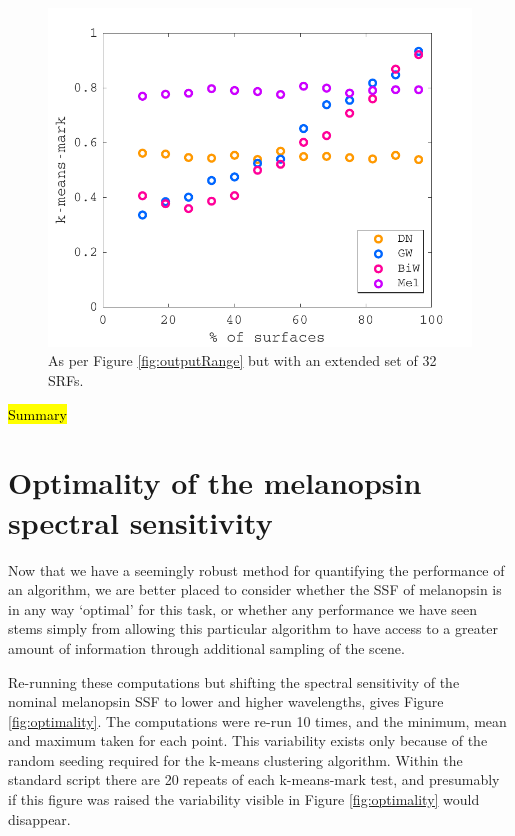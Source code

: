 \begin{figure}[htbp]
 \includegraphics[max width=\textwidth]{figs/comp/comparisonFourAlgos/outputRangeMore.pdf}
 \caption{As per Figure \ref{fig:outputRange} but with an extended set of 32 \glspl{SRF}.}
 \label{fig:outputRangeMore}
\end{figure} 

\hl{Summary} %


\section{Optimality of the melanopsin spectral sensitivity}


Now that we have a seemingly robust method for quantifying the performance of an algorithm, we are better placed to consider whether the \gls{SSF} of melanopsin is in any way `optimal' for this task, or whether any performance we have seen stems simply from allowing this particular algorithm to have access to a greater amount of information through additional sampling of the scene.

Re-running these computations but shifting the spectral sensitivity of the nominal melanopsin \gls{SSF} to lower and higher wavelengths, gives Figure \ref{fig:optimality}. The computations were re-run 10 times, and the minimum, mean and maximum taken for each point. This variability exists only because of the random seeding required for the k-means clustering algorithm. Within the standard script there are 20 repeats of each k-means-mark test, and presumably if this figure was raised the variability visible in Figure \ref{fig:optimality} would disappear.

